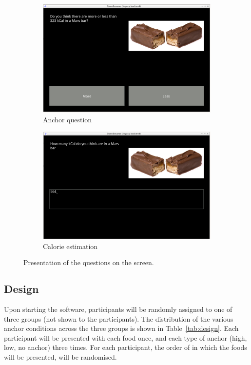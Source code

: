 \documentclass[a4paper,doc,natbib]{apa6}
\begin{document}
    \begin{figure}[h!]
        \begin{subfigure}[b]{0.49\textwidth}
            \caption{Anchor question}
            \includegraphics[width=0.95\linewidth]{Images/anchor_question.png}
        \end{subfigure}
        \begin{subfigure}[b]{0.49\textwidth}
            \caption{Calorie estimation}
            \includegraphics[width=0.95\linewidth]{Images/guess_question.png}
        \end{subfigure}
        \caption{Presentation of the questions on the screen.}
        \label{fig:screenshots}
    \end{figure}

    \subsection{Design}

    Upon starting the software, participants will be randomly assigned to one of three groups (not shown to the participants). The distribution of the various anchor conditions across the three groups is shown in Table~\ref{tab:design}. Each participant will be presented with each food once, and each type of anchor (high, low, no anchor) three times. For each participant, the order of in which the foods will be presented, will be randomised.
\end{document}
